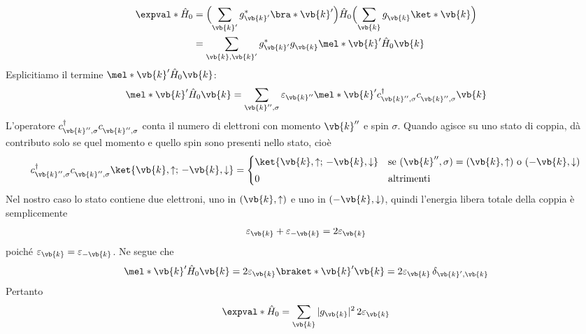\begin{equation*}
   \begin{split}
      \expval*{\hat{H}_0}
      &=
      \Bigl(\sum_{\vb{k}'} g_{\vb{k}'}^* \bra*{\vb{k}'}\Bigr)
      \hat{H}_0
      \Bigl(\sum_{\vb{k}} g^{\vphantom{*}}_{\vb{k}} \ket*{\vb{k}}\Bigr)
      \\
      &=
      \sum_{\vb{k},\vb{k}'} g^*_{\vb{k}'} g^{\vphantom{*}}_{\vb{k}}
      \mel*{\vb{k}'}{\hat{H}_0}{\vb{k}}
   \end{split}
\end{equation*}
Esplicitiamo il termine $\mel*{\vb{k}'}{\hat{H}_0}{\vb{k}}$:
\begin{equation*}
   \mel*{\vb{k}'}{\hat{H}_0}{\vb{k}}
   =
   \sum_{\vb{k}'',\sigma} \varepsilon_{\vb{k}''}
   \mel*{\vb{k}'}{c^{\dag}_{\vb{k}'',\sigma} c^{\vphantom{\dag}}_{\vb{k}'',\sigma}}{\vb{k}}
\end{equation*}
L'operatore $c^{\dag}_{\vb{k}'',\sigma} c^{\vphantom{\dag}}_{\vb{k}'',\sigma}$ conta il numero di elettroni con momento $\vb{k}''$ e spin $\sigma$. Quando agisce su uno stato di coppia, dà contributo solo se quel momento e quello spin sono presenti nello stato, cioè
\begin{equation*}
   c^{\dag}_{\vb{k}'',\sigma} c^{\vphantom{\dag}}_{\vb{k}'',\sigma}
   \ket{\vb{k},\uparrow;\,-\vb{k},\downarrow}
   =
   \begin{cases}
      \ket{\vb{k},\uparrow;\,-\vb{k},\downarrow} 
      & \text{se } (\vb{k}'',\sigma)=(\vb{k},\uparrow)\ \text{o}\ (-\vb{k},\downarrow)\\[0.1cm]
      0 & \text{altrimenti}
   \end{cases}
\end{equation*}
Nel nostro caso lo stato contiene due elettroni, uno in $(\vb{k},\uparrow)$ e uno in $(-\vb{k},\downarrow)$, quindi l'energia libera totale della coppia è semplicemente
\begin{equation*}
   \varepsilon_{\vb{k}} + \varepsilon_{-\vb{k}}
   =2\varepsilon_{\vb{k}}
\end{equation*}
poiché $\varepsilon_{\vb{k}}=\varepsilon_{-\vb{k}}$. Ne segue che
\begin{equation*}
   \mel*{\vb{k}'}{\hat{H}_0}{\vb{k}}
   =2\varepsilon_{\vb{k}} \braket*{\vb{k}'}{\vb{k}}
   =2\varepsilon_{\vb{k}}\,\delta_{\vb{k}',\vb{k}}
\end{equation*}
Pertanto
\begin{equation*}
   \expval*{\hat{H}_0}
   =\sum_{\vb{k}} |g_{\vb{k}}|^2\, 2\varepsilon_{\vb{k}}
\end{equation*}
